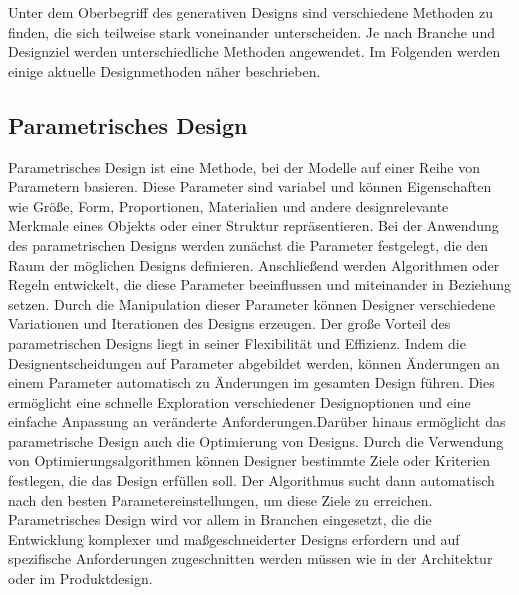 Unter dem Oberbegriff des generativen Designs sind verschiedene Methoden zu finden, die sich teilweise stark voneinander unterscheiden. Je nach Branche und Designziel werden unterschiedliche Methoden angewendet. Im Folgenden werden einige aktuelle Designmethoden näher beschrieben.

\label{chap:paramDesign}
\subsection*{Parametrisches Design}
Parametrisches Design ist eine Methode, bei der Modelle auf einer Reihe von Parametern basieren. Diese Parameter sind variabel und können Eigenschaften wie Größe, Form, Proportionen, Materialien und andere designrelevante Merkmale eines Objekts oder einer Struktur repräsentieren. Bei der Anwendung des parametrischen Designs werden zunächst die Parameter festgelegt, die den Raum der möglichen Designs definieren. Anschließend werden Algorithmen oder Regeln entwickelt, die diese Parameter beeinflussen und miteinander in Beziehung setzen. Durch die Manipulation dieser Parameter können Designer verschiedene Variationen und Iterationen des Designs erzeugen. Der große Vorteil des parametrischen Designs liegt in seiner Flexibilität und Effizienz. Indem die Designentscheidungen auf Parameter abgebildet werden, können Änderungen an einem Parameter automatisch zu Änderungen im gesamten Design führen. Dies ermöglicht eine schnelle Exploration verschiedener Designoptionen und eine einfache Anpassung an veränderte Anforderungen.Darüber hinaus ermöglicht das parametrische Design auch die Optimierung von Designs. Durch die Verwendung von Optimierungsalgorithmen können Designer bestimmte Ziele oder Kriterien festlegen, die das Design erfüllen soll. Der Algorithmus sucht dann automatisch nach den besten Parametereinstellungen, um diese Ziele zu erreichen. Parametrisches Design wird vor allem in Branchen eingesetzt, die die Entwicklung komplexer und maßgeschneiderter Designs erfordern und auf spezifische Anforderungen zugeschnitten werden müssen wie in der Architektur oder im Produktdesign.\autocite{2}

